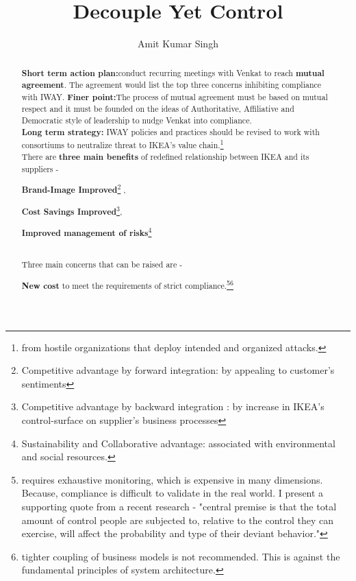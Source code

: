 \documentclass[a4paper, oneside, 11pt]{memoir}
\title{Decouple Yet Control}
\author{Amit Kumar Singh}
\begin{document}
\maketitle
\pagebreak
\renewcommand{\abstractname}{Executive Summary}
\begin{abstract}
\textbf{Short term action plan:}conduct recurring meetings with Venkat to reach \textbf{mutual agreement}. The agreement would list the top three concerns inhibiting compliance with IWAY. \textbf{Finer point:}The process of mutual agreement must be based on mutual respect \cite{smeltzer1997meaning} and it must be founded on the ideas of Authoritative, Affiliative and Democratic style of leadership \cite{goleman2000leadership} to nudge \cite{leonard2008richard} Venkat into compliance. \cite{tittle2018control} \cite{inderst2011countervailing} \\\textbf{Long term strategy:} IWAY policies and practices should be revised to work with consortiums to neutralize threat to IKEA's value chain.\footnote{ from hostile organizations that deploy intended and organized attacks.} \cite{publichearing1998_183}\\
There are \textbf{three main benefits} of redefined relationship between IKEA and its suppliers - \\
\begin{enumerate*}
 \item \textbf{Brand-Image Improved}\footnote{Competitive advantage by forward integration: by appealing to customer's sentiments} ,
 \item \textbf{Cost Savings Improved}\footnote{Competitive advantage by backward integration : by increase in IKEA's control-surface on supplier's business processes},
 \item \textbf{Improved management of risks}\footnote{Sustainability and Collaborative advantage: associated with environmental and social resources.}
\end{enumerate*} \\
Three main concerns that can be raised are - \\
\begin{enumerate*}
 \item \textbf{New cost} to meet the requirements of strict compliance.\footnote{ requires exhaustive monitoring, which is expensive in many dimensions. Because, compliance is difficult to validate in the real world. I present a supporting quote from a recent research - "central premise is that the total amount of control people are subjected to, relative to the control they can exercise, will affect the probability and type of their deviant behavior." }\footnote{tighter coupling of business models is not recommended. This is against the fundamental  principles of system architecture.}\cite{tittle2018control}

\end{enumerate*}
\end{abstract}
\end{document}

